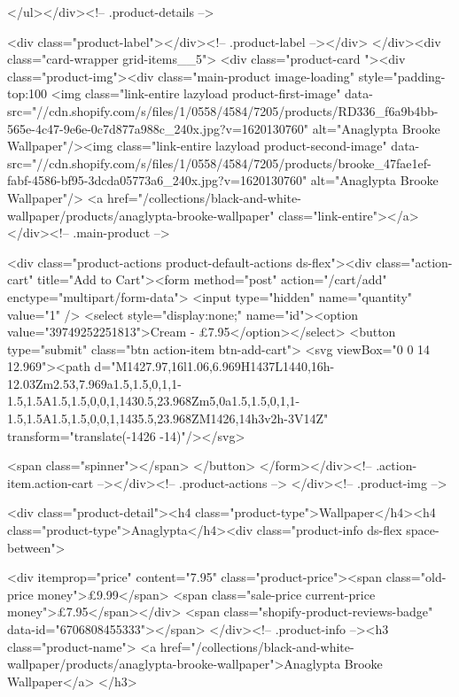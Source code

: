 {{{{{{{      </ul></div><!-- .product-details -->

<div class="product-label"></div><!-- .product-label --></div>
          </div><div class="card-wrapper grid-items__5">
            <div class="product-card "><div class="product-img"><div class="main-product image-loading" style="padding-top:100%
      <img class="link-entire lazyload product-first-image" data-src="//cdn.shopify.com/s/files/1/0558/4584/7205/products/RD336_f6a9b4bb-565e-4c47-9e6e-0c7d877a988c_240x.jpg?v=1620130760" alt="Anaglypta Brooke Wallpaper"/><img class="link-entire lazyload product-second-image" data-src="//cdn.shopify.com/s/files/1/0558/4584/7205/products/brooke_47fae1ef-fabf-4586-bf95-3dcda05773a6_240x.jpg?v=1620130760" alt="Anaglypta Brooke Wallpaper"/>
      <a href="/collections/black-and-white-wallpaper/products/anaglypta-brooke-wallpaper" class="link-entire"></a>
    </div><!-- .main-product -->
  
<div class="product-actions product-default-actions ds-flex"><div class="action-cart" title="Add to Cart"><form method="post" action="/cart/add" enctype="multipart/form-data">
            <input type="hidden" name="quantity" value="1" />
            <select style="display:none;" name="id"><option value="39749252251813">Cream - £7.95</option></select>
            <button type="submit" class="btn action-item btn-add-cart">
              <svg viewBox="0 0 14 12.969"><path d="M1427.97,16l1.06,6.969H1437L1440,16h-12.03Zm2.53,7.969a1.5,1.5,0,1,1-1.5,1.5A1.5,1.5,0,0,1,1430.5,23.968Zm5,0a1.5,1.5,0,1,1-1.5,1.5A1.5,1.5,0,0,1,1435.5,23.968ZM1426,14h3v2h-3V14Z" transform="translate(-1426 -14)"/></svg>

              <span class="spinner"></span>
            </button>
          </form></div><!-- .action-item.action-cart --></div><!-- .product-actions -->
</div><!-- .product-img -->

<div class="product-detail"><h4 class="product-type">Wallpaper</h4><h4 class="product-type">Anaglypta</h4><div class="product-info ds-flex space-between">
    
<div itemprop="price" content="7.95" class="product-price"><span class="old-price money">£9.99</span>
    <span class="sale-price current-price money">£7.95</span></div>
    <span class="shopify-product-reviews-badge" data-id="6706808455333"></span>
  </div><!-- .product-info --><h3 class="product-name">
      <a href="/collections/black-and-white-wallpaper/products/anaglypta-brooke-wallpaper">Anaglypta Brooke Wallpaper</a>
    </h3>
    
}}}}}}}
